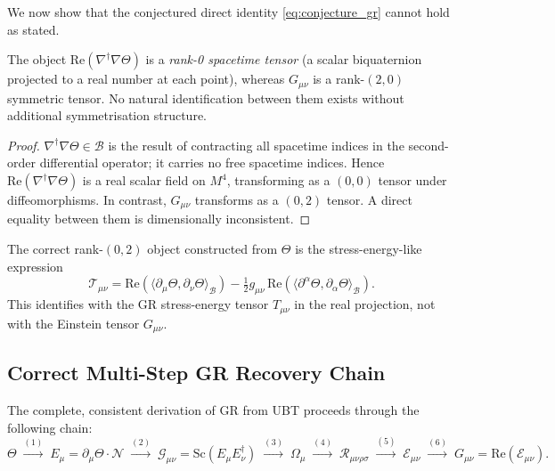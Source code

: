 We now show that the conjectured direct identity \eqref{eq:conjecture_gr}
cannot hold as stated.

\begin{proposition}
  \label{prop:rank_obstruction}
  The object $\mathrm{Re}(\nabla^\dagger\nabla\Theta)$ is a
  \emph{rank-0 spacetime tensor} (a scalar biquaternion projected to a real
  number at each point), whereas $G_{\mu\nu}$ is a rank-$(2,0)$ symmetric
  tensor.  No natural identification between them exists without additional
  symmetrisation structure.
\end{proposition}

\begin{proof}
  $\nabla^\dagger\nabla\Theta \in \mathcal{B}$ is the result of contracting all
  spacetime indices in the second-order differential operator; it carries no
  free spacetime indices.  Hence $\mathrm{Re}(\nabla^\dagger\nabla\Theta)$
  is a real scalar field on $M^4$, transforming as a $(0,0)$ tensor under
  diffeomorphisms.  In contrast, $G_{\mu\nu}$ transforms as a $(0,2)$ tensor.
  A direct equality between them is dimensionally inconsistent.
\end{proof}

\begin{remark}
  The correct rank-$(0,2)$ object constructed from $\Theta$ is the
  stress-energy-like expression
  \begin{equation}
    \label{eq:correct_rank2}
    \mathcal{T}_{\mu\nu}
    = \mathrm{Re}\!\left(\langle\partial_\mu\Theta,\partial_\nu\Theta\rangle_\mathcal{B}\right)
    - \tfrac{1}{2}g_{\mu\nu}\,
      \mathrm{Re}\!\left(\langle\partial^\alpha\Theta,\partial_\alpha\Theta\rangle_\mathcal{B}\right).
  \end{equation}
  This identifies with the GR stress-energy tensor $T_{\mu\nu}$ in the real
  projection, not with the Einstein tensor $G_{\mu\nu}$.
\end{remark}

\subsection{Correct Multi-Step GR Recovery Chain}

The complete, consistent derivation of GR from UBT proceeds through the
following chain:
\begin{equation}
  \label{eq:gr_recovery_chain}
  \Theta
  \;\xrightarrow{(1)}\; E_\mu = \partial_\mu\Theta\cdot\mathcal{N}
  \;\xrightarrow{(2)}\; \mathcal{G}_{\mu\nu} = \mathrm{Sc}(E_\mu E_\nu^\dagger)
  \;\xrightarrow{(3)}\; \Omega_\mu
  \;\xrightarrow{(4)}\; \mathcal{R}_{\mu\nu\rho\sigma}
  \;\xrightarrow{(5)}\; \mathcal{E}_{\mu\nu}
  \;\xrightarrow{(6)}\; G_{\mu\nu} = \mathrm{Re}(\mathcal{E}_{\mu\nu}).
\end{equation}

